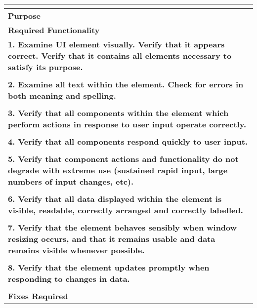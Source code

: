 \begin{longtable}{ l p{10cm} }
 \hline
 \multicolumn{2}{c}{\textbf{}}\\
 \hline
 \textbf{Purpose} & \\
 \textbf{Required Functionality} & \\
 \hline
 \multicolumn{2}{p{14cm}}{\textbf{1. Examine UI element visually. Verify that it appears correct. Verify that it contains all elements necessary to satisfy its purpose.}}\\
 \multicolumn{2}{p{14cm}}{}\\
 \hline
 \multicolumn{2}{p{14cm}}{\textbf{2. Examine all text within the element. Check for errors in both meaning and spelling.}}\\
 \multicolumn{2}{p{14cm}}{}\\
 \hline
 \multicolumn{2}{p{14cm}}{\textbf{3. Verify that all components within the element which perform actions in response to user input operate correctly.}}\\
 \multicolumn{2}{p{14cm}}{}\\
 \hline
 \multicolumn{2}{p{14cm}}{\textbf{4. Verify that all components respond quickly to user input.}}\\
 \multicolumn{2}{p{14cm}}{}\\
 \hline
 \multicolumn{2}{p{14cm}}{\textbf{5. Verify that component actions and functionality do not degrade with extreme use (sustained rapid input, large numbers of input changes, etc).}}\\
 \multicolumn{2}{p{14cm}}{}\\
 \hline
 \multicolumn{2}{p{14cm}}{\textbf{6. Verify that all data displayed within the element is visible, readable, correctly arranged and correctly labelled.}}\\
 \multicolumn{2}{p{14cm}}{}\\
 \hline
 \multicolumn{2}{p{14cm}}{\textbf{7. Verify that the element behaves sensibly when window resizing occurs, and that it remains usable and data remains visible whenever possible.}}\\
 \multicolumn{2}{p{14cm}}{}\\
 \hline
 \multicolumn{2}{p{14cm}}{\textbf{8. Verify that the element updates promptly when responding to changes in data.}}\\
 \multicolumn{2}{p{14cm}}{}\\
 \hline
 \textbf{Fixes Required} & \\
 \bottomrule
\end{longtable}
\clearpage

